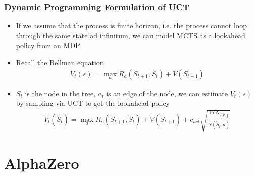 \documentclass{beamer}
\begin{document}

\begin{frame}
  \frametitle{Dynamic Programming Formulation of UCT}

  \begin{itemize}
      \item If we assume that the process is finite horizon, i.e. the process cannot loop through the same state ad infinitum, we can model MCTS as a lookahead policy from an MDP
      \item Recall the Bellman equation
        \begin{gather*}
          V_t(s) = \max_{a} R_a(S_{t+1}, S_t) + V(S_{t+1})
        \end{gather*}
      \item $S_t$ is the node in the tree, $a_t$ is an edge of the node, we can estimate $V_t(s)$ by sampling via UCT to get the lookahead policy
        \begin{gather*}
          \tilde{V}_t(\tilde{S_t}) = \max_{a} R_a(\tilde{S}_{t+1}, \tilde{S}_t) + \tilde{V}(\tilde{S}_{t+1}) + c_{uct} \sqrt{\frac{\ln N_(\tilde{S}_t)}{N(\tilde{S}_{t}, a)}}
        \end{gather*}
  \end{itemize}
\end{frame}


\section{AlphaZero}

\end{document}
